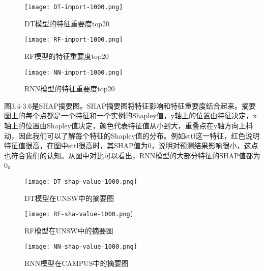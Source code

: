 \begin{figure}[htbp]
  \centering
  \begin{minipage}[t]{0.48\textwidth}
  \centering
  \texttt{[image: DT-import-1000.png]}
  \caption{DT模型的特征重要度top20}
  
  \end{minipage}
  \begin{minipage}[t]{0.48\textwidth}
  \centering
  \texttt{[image: RF-import-1000.png]}
  \caption{RF模型的特征重要度top20}
 
  \end{minipage}

  \begin{minipage}[t]{0.48\textwidth}
    \centering
    \texttt{[image: NN-import-1000.png]}
    \caption{RNN模型的特征重要度top20}
    
    \end{minipage}
  \end{figure}



图3.4-3.6是SHAP摘要图。SHAP摘要图将特征影响和特征重要度结合起来。摘要图上的每个点都是一个特征和一个实例的Shapley值，y轴上的位置由特征决定，x轴上的位置由Shapley值决定，颜色代表特征值从小到大，重叠点在y轴方向上抖动，因此我们可以了解每个特征的Shapley值的分布。例如sttl这一特征，红色说明特征值很高，在图中sttl很高时，其SHAP值为0，说明对预测结果影响很小，这点也符合我们的认知。从图中对比可以看出，RNN模型的大部分特征的SHAP值都为0。


\begin{figure}[htbp]
  \centering
  \begin{minipage}[t]{0.48\textwidth}
  \centering
  \texttt{[image: DT-shap-value-1000.png]}
  \caption{DT模型在UNSW中的摘要图}
  \end{minipage}
  \begin{minipage}[t]{0.48\textwidth}
  \centering
  \texttt{[image: RF-sha-value-1000.png]}
  \caption{RF模型在UNSW中的摘要图}
  \end{minipage}

  \begin{minipage}[t]{0.48\textwidth}
    \centering
    \texttt{[image: NN-shap-value-1000.png]}
    \caption{RNN模型在CAMPUS中的摘要图}
    \end{minipage}
  \end{figure}

